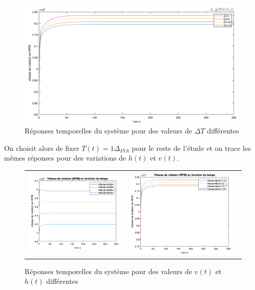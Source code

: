 \documentclass[12pt]{report}
\begin{document}
\begin{figure}[!h]
  \vspace{1cm}
  \centering
  \includegraphics[scale=0.3]{fig/step_response_deltaT.png}
  \caption{Réponses temporelles du système pour des valeurs de $\Delta T$ différentes}
  \vspace{0.2cm}
\end{figure}

On choisit alors de fixer $T(t) = 1\Delta_{ISA}$ pour le reste de l'étude et on
trace les mêmes réponses pour des variations de $h(t)$ et $v(t)$.

\begin{figure}[!h]
  \vspace{1cm}
  \centering

  \begin{tabular}{cc}
    \includegraphics[width=0.45\linewidth]{fig/step_response_h.png} &
    \includegraphics[width=0.45\linewidth]{fig/step_response_v.png} \\
  \end{tabular}
  \caption{Réponses temporelles du système pour des valeurs de $v(t)$ et $h(t)$ différentes}
  \vspace{0.5cm}
\end{figure}
\end{document}
